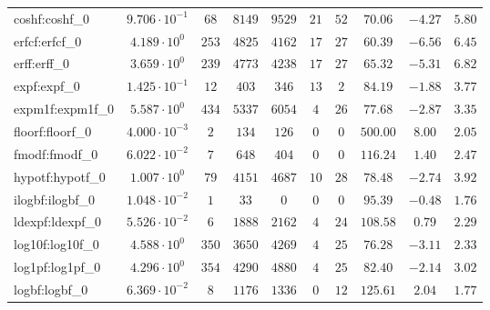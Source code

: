 \begin{tabular}{|l|c|c|c|c|c|c|c|c|c|}
coshf:coshf\_0               & $ 9.706 \cdot 10^{-1} $ & $ 68     $ & $ 8149   $ & $ 9529   $ & $ 21  $ & $ 52  $ & $ 70.06       $ & $ -4.27   $ & $ 5.80    $ \\
erfcf:erfcf\_0               & $ 4.189 \cdot 10^{0}  $ & $ 253    $ & $ 4825   $ & $ 4162   $ & $ 17  $ & $ 27  $ & $ 60.39       $ & $ -6.56   $ & $ 6.45    $ \\
erff:erff\_0                 & $ 3.659 \cdot 10^{0}  $ & $ 239    $ & $ 4773   $ & $ 4238   $ & $ 17  $ & $ 27  $ & $ 65.32       $ & $ -5.31   $ & $ 6.82    $ \\
expf:expf\_0                 & $ 1.425 \cdot 10^{-1} $ & $ 12     $ & $ 403    $ & $ 346    $ & $ 13  $ & $ 2   $ & $ 84.19       $ & $ -1.88   $ & $ 3.77    $ \\
expm1f:expm1f\_0             & $ 5.587 \cdot 10^{0}  $ & $ 434    $ & $ 5337   $ & $ 6054   $ & $ 4   $ & $ 26  $ & $ 77.68       $ & $ -2.87   $ & $ 3.35    $ \\
floorf:floorf\_0             & $ 4.000 \cdot 10^{-3} $ & $ 2      $ & $ 134    $ & $ 126    $ & $ 0   $ & $ 0   $ & $ 500.00      $ & $ 8.00    $ & $ 2.05    $ \\
fmodf:fmodf\_0               & $ 6.022 \cdot 10^{-2} $ & $ 7      $ & $ 648    $ & $ 404    $ & $ 0   $ & $ 0   $ & $ 116.24      $ & $ 1.40    $ & $ 2.47    $ \\
hypotf:hypotf\_0             & $ 1.007 \cdot 10^{0}  $ & $ 79     $ & $ 4151   $ & $ 4687   $ & $ 10  $ & $ 28  $ & $ 78.48       $ & $ -2.74   $ & $ 3.92    $ \\
ilogbf:ilogbf\_0             & $ 1.048 \cdot 10^{-2} $ & $ 1      $ & $ 33     $ & $ 0      $ & $ 0   $ & $ 0   $ & $ 95.39       $ & $ -0.48   $ & $ 1.76    $ \\
ldexpf:ldexpf\_0             & $ 5.526 \cdot 10^{-2} $ & $ 6      $ & $ 1888   $ & $ 2162   $ & $ 4   $ & $ 24  $ & $ 108.58      $ & $ 0.79    $ & $ 2.29    $ \\
log10f:log10f\_0             & $ 4.588 \cdot 10^{0}  $ & $ 350    $ & $ 3650   $ & $ 4269   $ & $ 4   $ & $ 25  $ & $ 76.28       $ & $ -3.11   $ & $ 2.33    $ \\
log1pf:log1pf\_0             & $ 4.296 \cdot 10^{0}  $ & $ 354    $ & $ 4290   $ & $ 4880   $ & $ 4   $ & $ 25  $ & $ 82.40       $ & $ -2.14   $ & $ 3.02    $ \\
logbf:logbf\_0               & $ 6.369 \cdot 10^{-2} $ & $ 8      $ & $ 1176   $ & $ 1336   $ & $ 0   $ & $ 12  $ & $ 125.61      $ & $ 2.04    $ & $ 1.77    $ \\

\end{tabular}
